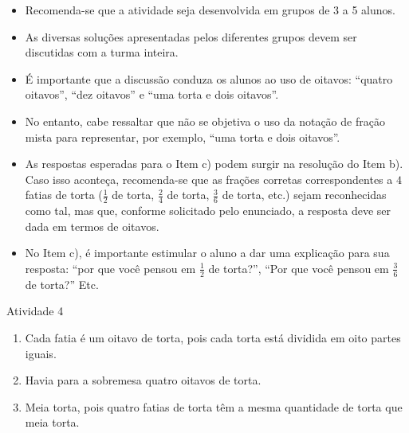 \begin{multicols}{2}
  \vspace{.1cm}

  \vspace{.1cm}

\begin{itemize} %
    \item       Recomenda-se que a atividade seja desenvolvida em grupos de 3 a 5 alunos.
    \item       As diversas soluções apresentadas pelos diferentes grupos devem ser discutidas com a turma inteira.
    \item       É importante que a discussão conduza os alunos ao uso de oitavos:       ``quatro oitavos'',       ``dez oitavos''     e       ``uma torta e dois oitavos''.
    \item       No entanto, cabe ressaltar que não se objetiva o uso da notação de fração mista para representar, por exemplo,       ``uma torta e dois oitavos''.
    \item       As respostas esperadas para o Item c) podem surgir na resolução do Item b). Caso isso aconteça, recomenda-se que as frações corretas correspondentes a       $4$ fatias de torta ($\frac{1}{2}$ de torta,       $\frac{2}{4}$ de torta,       $\frac{3}{6}$ de torta, etc.) sejam reconhecidas como tal, mas que, conforme solicitado pelo enunciado, a resposta deve ser dada em termos de oitavos.
    \item       No Item c), é importante estimular o aluno a dar uma explicação para sua resposta: ``por que você pensou em       $\frac{1}{2}$ de torta?'', ``Por que você pensou em       $\frac{3}{6}$ de torta?'' Etc.
\end{itemize} %


  \vspace{.1cm}





\begin{resposta*}{Atividade 4}
\begin{enumerate} [\quad a)] %
    \item       Cada fatia é um oitavo de torta, pois cada torta está dividida em oito partes iguais.
    \item       Havia para a sobremesa quatro oitavos de torta.
    \item       Meia torta, pois quatro fatias de torta têm a mesma quantidade de torta que meia torta.
\end{enumerate} %


\end{resposta*}
\end{multicols}
